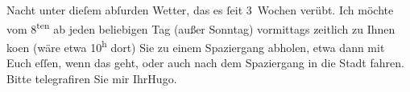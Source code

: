                Nacht unter dieſem abſurden Wetter, das es ſeit 3 Wochen verübt.\pend
           \pstart
           Ich möchte vom 8\textsuperscript{ten} ab jeden beliebigen Tag (außer Sonntag) vormittags zeitlich zu Ihnen ko{\geminationm}en (wäre etwa 10\textsuperscript{h} dort) Sie zu einem Spaziergang abholen, etwa dann mit Euch eſſen, wenn das
               geht, oder auch nach dem Spaziergang in die Stadt fahren. Bitte telegrafiren Sie mir
                  \label{T_L02345_1v}\label{T_L02345_1h}\pend
           \pstart Ihr\spacefill\mbox{Hugo.}\pend{}\endnumbering{}  
      